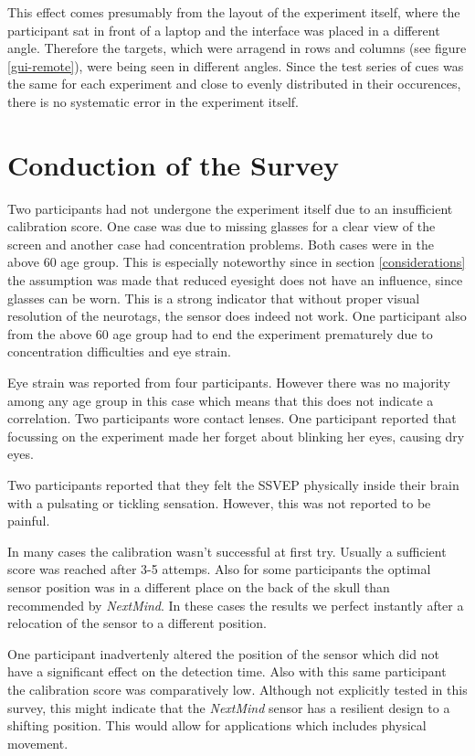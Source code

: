             This effect comes presumably from the layout of the experiment itself, where the participant sat in front of a laptop and the interface was placed in a different angle. Therefore the targets, which were arragend in rows and columns (see figure \ref*{gui-remote}), were being seen in different angles. Since the test series of cues was the same for each experiment and close to evenly distributed in their occurences, there is no systematic error in the experiment itself.
            
        \section{Conduction of the Survey}
            
            Two participants had not undergone the experiment itself due to an insufficient calibration score. One case was due to missing glasses for a clear view of the screen and another case had concentration problems. Both cases were in the above 60 age group. This is especially noteworthy since in section \ref*{considerations} the assumption was made that reduced eyesight does not have an influence, since glasses can be worn. This is a strong indicator that without proper visual resolution of the neurotags, the sensor does indeed not work.
            One participant also from the above 60 age group had to end the experiment prematurely due to concentration difficulties and eye strain.

            Eye strain was reported from four participants. However there was no majority among any age group in this case which means that this does not indicate a correlation. Two participants wore contact lenses. One participant reported that focussing on the experiment made her forget about blinking her eyes, causing dry eyes.

            Two participants reported that they felt the SSVEP physically inside their brain with a pulsating or tickling sensation. However, this was not reported to be painful.

            In many cases the calibration wasn't successful at first try. Usually a sufficient score was reached after 3-5 attemps. Also for some participants the optimal sensor position was in a different place on the back of the skull than recommended by \textit{NextMind}. In these cases the results we perfect instantly after a relocation of the sensor to a different position.

            One participant inadvertenly altered the position of the sensor which did not have a significant effect on the detection time. Also with this same participant the calibration score was comparatively low. Although not explicitly tested in this survey, this might indicate that the \textit{NextMind} sensor has a resilient design to a shifting position. This would allow for applications which includes physical movement.

